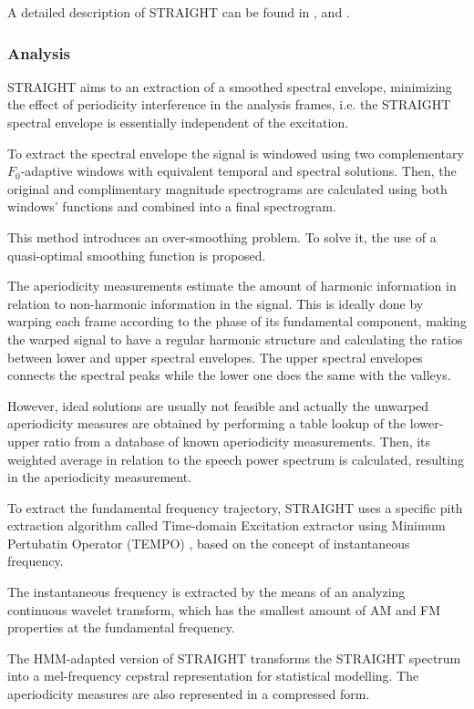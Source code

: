 A detailed description of STRAIGHT can be found in \cite{kawahara1997speech}, \cite{heiga2007details} and \cite{manuMSc}.

\subsubsection{Analysis}
\label{vocoders_straight_analysis}
STRAIGHT aims to an extraction of a smoothed spectral envelope, minimizing the effect of periodicity interference in the analysis frames, i.e. the STRAIGHT spectral envelope is essentially independent of the excitation.

To extract the spectral envelope the signal is windowed using two complementary $F_{0}$-adaptive windows with equivalent temporal and spectral solutions.
%
Then, the original and complimentary magnitude spectrograms are calculated using both windows' functions and combined into a final spectrogram.

This method introduces an over-smoothing problem.
% 
To solve it, the use of a quasi-optimal smoothing function is proposed.

The aperiodicity measurements estimate the amount of harmonic information in relation to non-harmonic information in the signal.
%
This is ideally done by warping each frame according to the phase of its fundamental component, making the warped signal to have a regular harmonic structure and calculating the ratios between lower and upper spectral envelopes.
%
The upper spectral envelopes connects the spectral peaks while the lower one does the same with the valleys.

However, ideal solutions are usually not feasible and actually the unwarped aperiodicity measures are obtained by performing a table lookup of the lower-upper ratio from a database of known aperiodicity measurements.
%
Then, its weighted average in relation to the speech power spectrum is calculated, resulting in the aperiodicity measurement.

To extract the fundamental frequency trajectory, STRAIGHT uses a specific pith extraction algorithm called Time-domain Excitation extractor using Minimum Pertubatin Operator (TEMPO) \cite{kawahara1999restructuring}, based on the concept of instantaneous frequency.

The instantaneous frequency is extracted by the means of an analyzing continuous wavelet transform, which has the smallest amount of AM and FM properties at the fundamental frequency.

The HMM-adapted version of STRAIGHT transforms the STRAIGHT spectrum into a mel-frequency cepstral representation for statistical modelling.
%
The aperiodicity measures are also represented in a compressed form.

